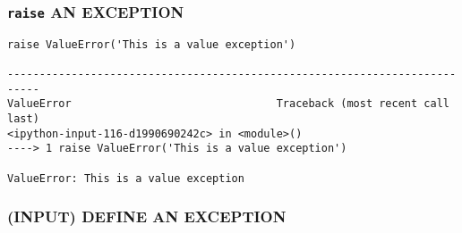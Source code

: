 \documentclass[11pt]{article}
\begin{document}
    \hypertarget{raise-an-exception}{%
\subsubsection{\texorpdfstring{\texttt{raise} AN
EXCEPTION}{raise AN EXCEPTION}}\label{raise-an-exception}}

    \begin{verbatim}
raise ValueError('This is a value exception')

---------------------------------------------------------------------------
ValueError                                Traceback (most recent call last)
<ipython-input-116-d1990690242c> in <module>()
----> 1 raise ValueError('This is a value exception')

ValueError: This is a value exception
\end{verbatim}

    \hypertarget{input-define-an-exception}{%
\subsubsection{(INPUT) DEFINE AN
EXCEPTION}\label{input-define-an-exception}}
\end{document}
